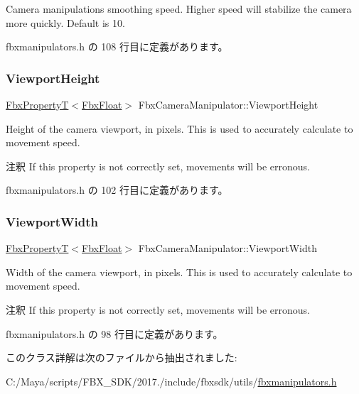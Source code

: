 Camera manipulations smoothing speed. Higher speed will stabilize the camera more quickly. Default is 10. 

 fbxmanipulators.\+h の 108 行目に定義があります。

\mbox{\label{class_fbx_camera_manipulator_afdf345d7e5f01d42da8011bbeb8dc394}} 
\subsubsection{\texorpdfstring{Viewport\+Height}{ViewportHeight}}
{\footnotesize\ttfamily \hyperlink{class_fbx_property_t}{Fbx\+PropertyT}$<$\hyperlink{fbxtypes_8h_aef968e37f2ddc4188de464d8578c1d5c}{Fbx\+Float}$>$ Fbx\+Camera\+Manipulator\+::\+Viewport\+Height}

Height of the camera viewport, in pixels. This is used to accurately calculate to movement speed. \begin{DoxyRemark}{注釈}
If this property is not correctly set, movements will be erronous. 
\end{DoxyRemark}


 fbxmanipulators.\+h の 102 行目に定義があります。

\mbox{\label{class_fbx_camera_manipulator_a03e2795ba49c8bcce02dc786356ab2d5}} 
\subsubsection{\texorpdfstring{Viewport\+Width}{ViewportWidth}}
{\footnotesize\ttfamily \hyperlink{class_fbx_property_t}{Fbx\+PropertyT}$<$\hyperlink{fbxtypes_8h_aef968e37f2ddc4188de464d8578c1d5c}{Fbx\+Float}$>$ Fbx\+Camera\+Manipulator\+::\+Viewport\+Width}

Width of the camera viewport, in pixels. This is used to accurately calculate to movement speed. \begin{DoxyRemark}{注釈}
If this property is not correctly set, movements will be erronous. 
\end{DoxyRemark}


 fbxmanipulators.\+h の 98 行目に定義があります。



このクラス詳解は次のファイルから抽出されました\+:\begin{DoxyCompactItemize}
\item 
C\+:/\+Maya/scripts/\+F\+B\+X\+\_\+\+S\+D\+K/2017./include/fbxsdk/utils/\hyperlink{fbxmanipulators_8h}{fbxmanipulators.\+h}\end{DoxyCompactItemize}
